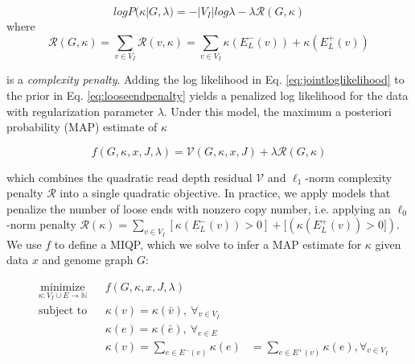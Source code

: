 \documentclass[phd,tocprelim]{cornell}
\begin{document}
\begin{equation} \label{eq:looseendpenalty}
    log P(\kappa | G, \lambda) = -|V_I|log\lambda - \lambda \mathcal{R}(G, \kappa)
\end{equation}
where
\begin{equation} \label{eq:complexitypenalty}
    \mathcal{R}(G, \kappa) = \sum_{v \in V_I} \mathcal{R}(v, \kappa) = \sum_{v \in V_I} \kappa(E_L^-(v))  + \kappa(E_L^+(v))
\end{equation}

is a \textit{complexity penalty}. Adding the log likelihood in  Eq. \ref{eq:jointloglikelihood} to the prior in Eq. \ref{eq:looseendpenalty} yields a penalized log likelihood for the data with regularization parameter $\lambda$. Under this model, the maximum a posteriori probability (MAP) estimate of $\kappa$

\begin{equation} \label{eq:objectivefunction}
    f(G, \kappa, x, J, \lambda) = \mathcal{V}(G,\kappa, x, J) + \lambda \mathcal{R}(G, \kappa)
\end{equation}

which combines the quadratic read depth residual $\mathcal{V}$ and $\ell_1$-norm  complexity penalty $\mathcal{R}$ into a single quadratic objective.   In practice, we apply models that penalize the number of loose ends with nonzero copy number, i.e. applying an $\ell_0$-norm penalty  $\mathcal{R}(\kappa) = \sum_{v \in V_I} [\kappa(E_L^-(v))>0]  + [(\kappa(E_L^+(v))>0])$.  We use $f$ to define a MIQP, which we solve to infer a MAP estimate for $\kappa$ given data $x$ and genome graph $G$:

\begin{equation} \label{eq:MIQP}
    \begin{aligned}
         & \underset{\kappa: V_I \cup E \rightarrow \mathbb{N}}{\text{minimize}}
         &                                                                       & f(G, \kappa, x, J, \lambda)                                                                                                                               \\
         & \text{subject to}
         &                                                                       & \kappa(v) = \kappa(\bar{v}),\ \forall_{v \in V_I}                                                                                                         \\
         &                                                                       &                                                   & \kappa(e) = \kappa(\bar{e}),\ \forall_{e \in E}                                                       \\
         &                                                                       &                                                   & \kappa(v)= \sum_{e\in E^-(v)} \kappa(e)         & = \sum_{e\in E^+(v)} \kappa(e), \forall_{v \in V_I} \\
    \end{aligned}
\end{equation}
\end{document}
